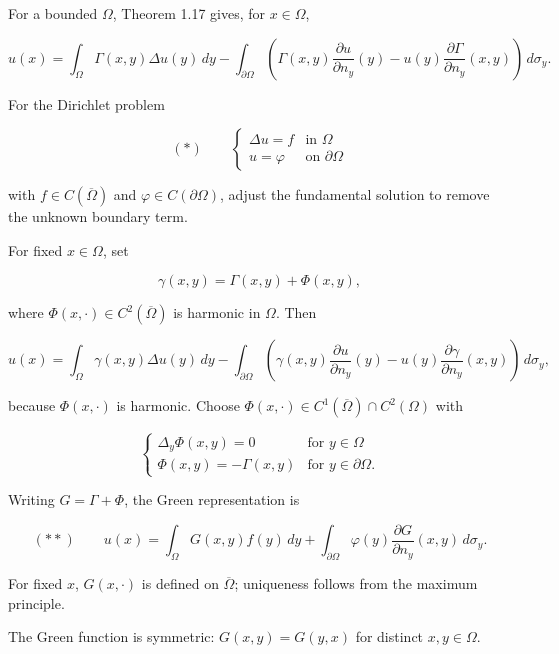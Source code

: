 For a bounded $\Omega$, Theorem 1.17 gives, for $x\in\Omega$,

\[
u(x) = \int_{\Omega} \Gamma(x,y)\Delta u(y)\,dy - \int_{\partial \Omega} \left(\Gamma(x,y)\frac{\partial u}{\partial n_y}(y) - u(y)\frac{\partial \Gamma}{\partial n_y}(x,y)\right)\,d\sigma_y.
\]

For the Dirichlet problem

\[
(\ast)\qquad
\begin{cases}
\Delta u = f & \text{in } \Omega \\
u = \varphi & \text{on } \partial \Omega
\end{cases}
\]

with $f\in C(\overline\Omega)$ and $\varphi\in C(\partial\Omega)$, adjust the
fundamental solution to remove the unknown boundary term.

For fixed $x\in\Omega$, set

\[
\gamma(x,y) = \Gamma(x,y) + \Phi(x,y),
\]

where $\Phi(x,\cdot)\in C^2(\overline\Omega)$ is harmonic in $\Omega$. Then

\[
u(x) = \int_{\Omega} \gamma(x,y)\Delta u(y)\,dy - \int_{\partial \Omega} \left(\gamma(x,y)\frac{\partial u}{\partial n_y}(y) - u(y)\frac{\partial \gamma}{\partial n_y}(x,y)\right)\,d\sigma_y,
\]

because $\Phi(x,\cdot)$ is harmonic. Choose
$\Phi(x,\cdot)\in C^1(\overline\Omega)\cap C^2(\Omega)$ with

\[
\begin{cases}
\Delta_y \Phi(x,y) = 0 & \text{for } y \in \Omega \\
\Phi(x,y) = -\Gamma(x,y) & \text{for } y \in \partial \Omega.
\end{cases}
\]

Writing $G=\Gamma+\Phi$, the Green representation is

\[
(**)\qquad
u(x) = \int_{\Omega} G(x,y)f(y)\,dy + \int_{\partial \Omega} \varphi(y)\frac{\partial G}{\partial n_y}(x,y)\,d\sigma_y.
\]

For fixed $x$, $G(x,\cdot)$ is defined on $\overline\Omega$; uniqueness follows from
the maximum principle.

\begin{lemma}\label{hanlin:lemma-green-symmetric}
The Green function is symmetric: $G(x,y)=G(y,x)$ for distinct $x,y\in\Omega$.
\end{lemma}


